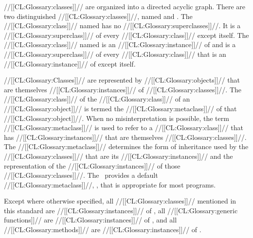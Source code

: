 //[[CL:Glossary:classes]]// are organized into a directed acyclic graph. There are two distinguished //[[CL:Glossary:classes]]//, named  and . The //[[CL:Glossary:class]]// named  has no //[[CL:Glossary:superclasses]]//.  It is a //[[CL:Glossary:superclass]]// of every //[[CL:Glossary:class]]// except itself.   The //[[CL:Glossary:class]]// named  is an //[[CL:Glossary:instance]]// of   and is a //[[CL:Glossary:superclass]]// of every //[[CL:Glossary:class]]// that is an //[[CL:Glossary:instance]]// of  except itself.


//[[CL:Glossary:Classes]]// are represented by //[[CL:Glossary:objects]]// that are themselves //[[CL:Glossary:instances]]// of //[[CL:Glossary:classes]]//.  The //[[CL:Glossary:class]]// of the //[[CL:Glossary:class]]// of an //[[CL:Glossary:object]]// is termed the //[[CL:Glossary:metaclass]]// of that //[[CL:Glossary:object]]//. When no misinterpretation is possible, the term //[[CL:Glossary:metaclass]]// is used to refer to a //[[CL:Glossary:class]]// that has //[[CL:Glossary:instances]]// that are themselves //[[CL:Glossary:classes]]//. The //[[CL:Glossary:metaclass]]// determines the form of inheritance used by the //[[CL:Glossary:classes]]// that are its //[[CL:Glossary:instances]]// and the representation of the //[[CL:Glossary:instances]]// of those //[[CL:Glossary:classes]]//. The \CLOS\ provides a default //[[CL:Glossary:metaclass]]//, , that is appropriate for most programs.

Except where otherwise specified, all //[[CL:Glossary:classes]]// mentioned in this standard are //[[CL:Glossary:instances]]// of , all //[[CL:Glossary:generic functions]]// are //[[CL:Glossary:instances]]//  of , and all //[[CL:Glossary:methods]]// are //[[CL:Glossary:instances]]// of .

